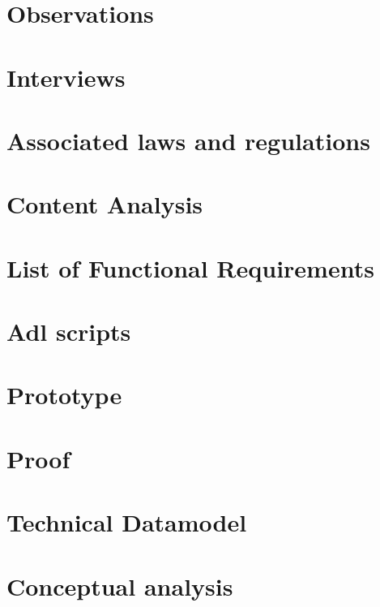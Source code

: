 \newpage
\appendix

\section{Observations} \label{appendixLoglines}

%
%
%
%


\newpage
\section{Interviews}\label{appendixInterviews}


\newpage
\section{Associated laws and regulations}\label{list:ass-laws-regulations}


\newpage
\section{Content Analysis}\label{appendixContentAnalysis}


\newpage
\section{List of Functional Requirements}\label{appendix-functiontal-requirements}


\newpage
\section{Adl scripts}\label{appendixAdl}


\newpage
\section{Prototype}\label{appendixPrototype}


\newpage
\section{Proof}\label{appendixProof}


\newpage
\section{Technical Datamodel}\label{appendixTechDatamodel}



\newpage
\section{Conceptual analysis}\label{ConceptualAnalysis}



